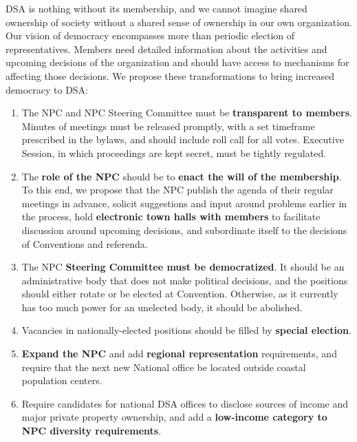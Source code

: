 \documentclass[10pt]{memoir}
\begin{document}
DSA is nothing without its membership, and we cannot imagine shared ownership of society without a shared sense of ownership in our own organization. Our vision of democracy encompasses more than periodic election of representatives. Members need detailed information about the activities and upcoming decisions of the organization and should have access to mechanisms for affecting those decisions. We propose these transformations to bring increased democracy to DSA:
\begin{enumerate}
\item{
The NPC and NPC Steering Committee must be \textbf{transparent to members}. Minutes of meetings must be released promptly, with a set timeframe prescribed in the bylaws, and should include roll call for all votes. Executive Session, in which proceedings are kept secret, must be tightly regulated.
}

\item{
The \textbf{role of the NPC} should be to \textbf{enact the will of the \linebreak membership}. To this end, we propose that the NPC publish the agenda of their regular meetings in advance, solicit suggestions and input around problems earlier in the process, hold \textbf{electronic town halls with members} to facilitate discussion around upcoming decisions, and subordinate itself to the decisions of Conventions and referenda.
}

\item{
The NPC \textbf{Steering Committee must be democratized}. It should be an administrative body that does not make political decisions, and the positions should either rotate or be elected at Convention. Otherwise, as it currently has too much power for an unelected body, it should be abolished.
}

\item{
Vacancies in nationally-elected positions should be filled by \linebreak\textbf{special election}.
}

\item{
\textbf{Expand the NPC} and add \textbf{regional representation} requirements, and require that the next new National office be located outside coastal population centers.
}

\item{
Require candidates for national DSA offices to disclose sources of income and major private property ownership, and add a \textbf{low-income category to NPC diversity requirements}.
}


\end{enumerate}
\end{document}

